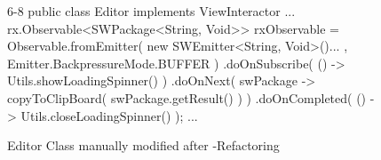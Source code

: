 \begin{figure}[H]
\begin{sourcecode}
\begin{javacode}{6-8}
public class Editor implements ViewInteractor
{
...
		rx.Observable<SWPackage<String, Void>> rxObservable = Observable.fromEmitter( new SWEmitter<String, Void>(){...
		}, Emitter.BackpressureMode.BUFFER )
                .doOnSubscribe( () -> Utils.showLoadingSpinner() )
                .doOnNext( swPackage -> copyToClipBoard( swPackage.getResult() ) )
                .doOnCompleted( () -> Utils.closeLoadingSpinner() );
...
}
\end{javacode}
\caption{Editor Class manually modified after \toolextension{}-Refactoring}
\label{code:example-editor}
\end{sourcecode}
\end{figure}